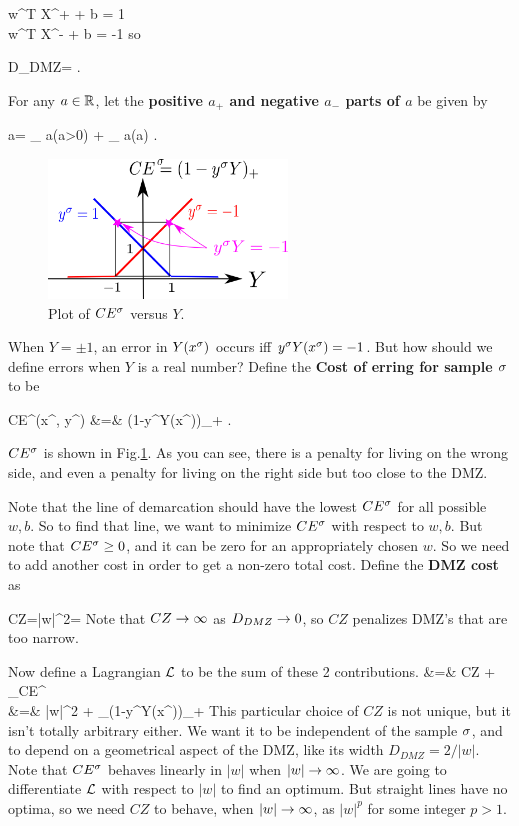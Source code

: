 \beqa
w^T X^+ + b = 1
\\
w^T X^- + b = -1
\eeqa
so

\beq
D_{DMZ}= 
\;.
\eeq

For any $a\in { \mathbb{R}}$, let 
the {\bf positive $a_+$ 
and negative $a_-$
parts of $a$} be
given by

\beq
a= 
_
{ a\indi(a>0)} 
+ 
_
{ a\indi(a)}
\;.
\eeq
\begin{figure}[h!]
\centering
\includegraphics[width=2.5in]
{svm/svm-hinge.png}
\caption{Plot of $CE^\sigma$ versus $Y$.} 
\label{fig-svm-hinge}
\end{figure}

When $Y=\pm 1$,
an  error in $Y(x^\sigma)$  occurs iff $y^\sigma Y(x^\sigma)=-1$.
But how should we define
errors when $Y$ is a real number?
Define the {\bf Cost of erring for sample $\sigma$} to be

\beqa
CE^\s(x^\s, y^\s)
&=&
(1-y^\s Y(x^\s))_+
\;.
\eeqa

$CE^\sigma$ is shown in Fig.\ref{fig-svm-hinge}.
As you can see, 
there is a penalty for living on the
wrong side, 
and even a penalty for living on the 
right side but too close to the DMZ.

Note that the line of demarcation
should have the lowest $CE^\sigma$
for all possible $w, b$. So to find
that line,
we want to minimize  $CE^\sigma$
with respect to $w, b$.
But note that $CE^\sigma\geq 0$, 
and it can be zero for an appropriately
chosen $w$. So we need to add another 
cost in order to get a non-zero total cost.
Define the {\bf DMZ cost} as 

\beq
CZ=|w|^2=
\eeq
Note that $CZ\rightarrow \infty$
as $D_{DMZ}\rightarrow 0$,
so $CZ$ penalizes DMZ's that are too narrow.

Now define a Lagrangian ${\cal L}$
to be the sum 
of these 2 contributions.
\beqa
\call&=& CZ + \sum_\s CE^\s
\\
&=&
  |w|^2 + \sum_\s (1-y^\s Y(x^\s))_+
\eeqa
This particular choice of $CZ$
is not unique, but it isn't totally arbitrary either. 
We want it to be independent of the sample $\sigma$,
and to depend on a geometrical aspect of the DMZ,
 like its width $D_{DMZ}=2/|w|$.
Note that $CE^\sigma$ behaves linearly in $|w|$ 
when $|w|\rightarrow \infty$.
We are going to differentiate ${\cal L}$ with 
respect to $|w|$
to find an optimum.
But straight lines have no optima, so we need
$CZ$ to behave, when $|w|\rightarrow \infty$,
  as $|w|^p$ for some 
integer $p>1$.



